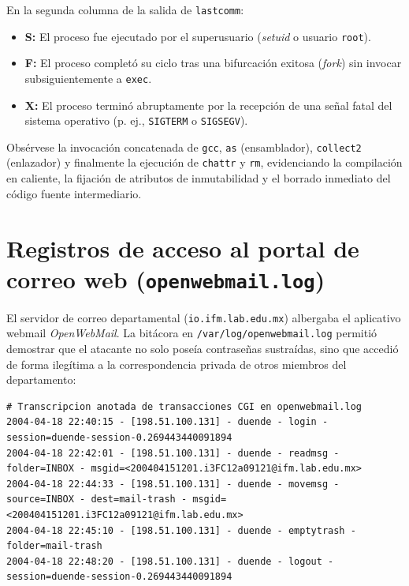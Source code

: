 \begin{notaforense}
En la segunda columna de la salida de \texttt{lastcomm}:
\begin{itemize}
    \item \textbf{S:} El proceso fue ejecutado por el superusuario (\textit{setuid} o usuario \texttt{root}).
    \item \textbf{F:} El proceso completó su ciclo tras una bifurcación exitosa (\textit{fork}) sin invocar subsiguientemente a \texttt{exec}.
    \item \textbf{X:} El proceso terminó abruptamente por la recepción de una señal fatal del sistema operativo (p. ej., \texttt{SIGTERM} o \texttt{SIGSEGV}).
\end{itemize}
Obsérvese la invocación concatenada de \texttt{gcc}, \texttt{as} (ensamblador), \texttt{collect2} (enlazador) y finalmente la ejecución de \texttt{chattr} y \texttt{rm}, evidenciando la compilación en caliente, la fijación de atributos de inmutabilidad y el borrado inmediato del código fuente intermediario.
\end{notaforense}

\section{Registros de acceso al portal de correo web (\texttt{openwebmail.log})}

El servidor de correo departamental (\texttt{io.ifm.lab.edu.mx}) albergaba el aplicativo webmail \textit{OpenWebMail}. La bitácora en \texttt{/var/log/openwebmail.log} permitió demostrar que el atacante no solo poseía contraseñas sustraídas, sino que accedió de forma ilegítima a la correspondencia privada de otros miembros del departamento:

\begin{lstlisting}[style=terminal]
# Transcripcion anotada de transacciones CGI en openwebmail.log
2004-04-18 22:40:15 - [198.51.100.131] - duende - login - session=duende-session-0.269443440091894
2004-04-18 22:42:01 - [198.51.100.131] - duende - readmsg - folder=INBOX - msgid=<200404151201.i3FC12a09121@ifm.lab.edu.mx>
2004-04-18 22:44:33 - [198.51.100.131] - duende - movemsg - source=INBOX - dest=mail-trash - msgid=<200404151201.i3FC12a09121@ifm.lab.edu.mx>
2004-04-18 22:45:10 - [198.51.100.131] - duende - emptytrash - folder=mail-trash
2004-04-18 22:48:20 - [198.51.100.131] - duende - logout - session=duende-session-0.269443440091894
\end{lstlisting}

